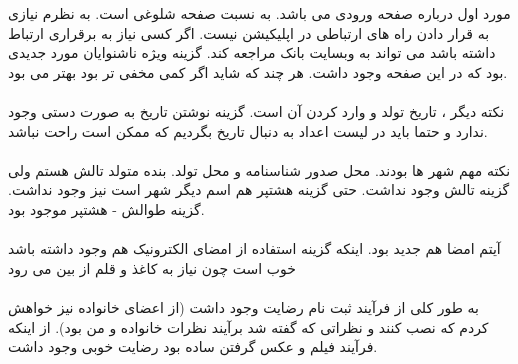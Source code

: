 \documentclass{article}
\begin{document}
مورد اول درباره صفحه ورودی می باشد. به نسبت صفحه شلوغی است. به نظرم نیازی به قرار دادن راه های ارتباطی در اپلیکیشن نیست. اگر کسی نیاز به برقراری ارتباط داشته باشد می تواند به وبسایت بانک مراجعه کند. گزینه ویژه ناشنوایان مورد جدیدی بود که در این صفحه وجود داشت. هر چند که شاید اگر کمی مخفی تر بود بهتر می بود.
\paragraph{}
نکته دیگر ، تاریخ تولد و وارد کردن آن است. گزینه نوشتن تاریخ به صورت دستی وجود ندارد و حتما باید در لیست اعداد به دنبال تاریخ بگردیم که ممکن است راحت نباشد.
\paragraph{}
نکته مهم شهر ها بودند. محل صدور شناسنامه و محل تولد. بنده متولد تالش هستم ولی گزینه تالش وجود نداشت. حتی گزینه هشتپر هم اسم دیگر شهر است نیز وجود نداشت. گزینه طوالش - هشتپر موجود بود.
\paragraph{}
آیتم امضا هم جدید بود. اینکه گزینه استفاده از امضای الکترونیک هم وجود داشته باشد خوب است چون نیاز به کاغذ و قلم از بین می رود
\paragraph{}
به طور کلی از فرآیند ثبت نام رضایت وجود داشت (از اعضای خانواده نیز خواهش کردم که نصب کنند و نظراتی که گفته شد برآیند نظرات خانواده و من بود). از اینکه فرآیند فیلم و عکس گرفتن ساده بود رضایت خوبی وجود داشت.
	
\end{document}
